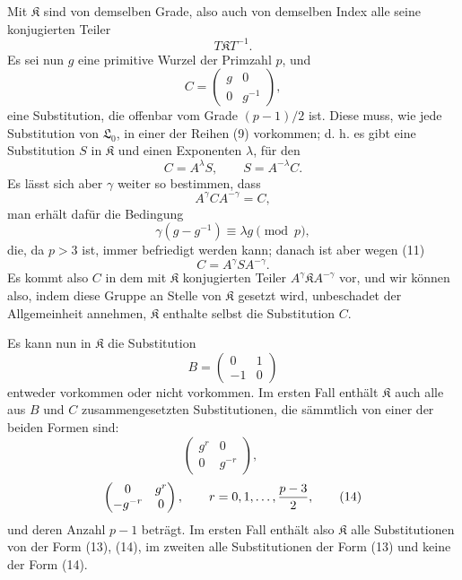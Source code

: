 \documentclass[11pt]{article}
\providecommand{\Lzero}{\mathfrak L_0}
\providecommand{\Kgrp}{\mathfrak K}
\begin{document}
Mit $\Kgrp$ sind von demselben Grade, also auch von demselben Index alle seine konjugierten Teiler
\[
 T\Kgrp T^{-1}.
\]
Es sei nun $g$ eine primitive Wurzel der Primzahl $p$, und
\begin{equation}
 C=\begin{pmatrix}g&0\\0&g^{-1}\end{pmatrix},
\tag{10}
\end{equation}
eine Substitution, die offenbar vom Grade $(p-1)/2$ ist. Diese muss, wie jede Substitution von $\Lzero$, in einer der Reihen (9) vorkommen; d. h. es gibt eine Substitution $S$ in $\Kgrp$ und einen Exponenten $\lambda$, für den
\begin{equation}
 C=A^\lambda S,\qquad S=A^{-\lambda}C.
\tag{11}
\end{equation}
Es lässt sich aber $\gamma$ weiter so bestimmen, dass
\begin{equation}
 A^\gamma C A^{-\gamma}=C,
\tag{12}
\end{equation}
man erhält dafür die Bedingung
\[
 \gamma(g-g^{-1})\equiv\lambda g\pmod p,
\]
die, da $p>3$ ist, immer befriedigt werden kann; danach ist aber wegen (11)
\[
 C=A^\gamma S A^{-\gamma}.
\]
Es kommt also $C$ in dem mit $\Kgrp$ konjugierten Teiler $A^\gamma\Kgrp A^{-\gamma}$ vor, und wir können also, indem diese Gruppe an Stelle von $\Kgrp$ gesetzt wird, unbeschadet der Allgemeinheit annehmen, $\Kgrp$ enthalte selbst die Substitution $C$.

Es kann nun in $\Kgrp$ die Substitution
\[
 B=\begin{pmatrix}0&1\\-1&0\end{pmatrix}
\]
entweder vorkommen oder nicht vorkommen. Im ersten Fall enthält $\Kgrp$ auch alle aus $B$ und $C$ zusammengesetzten Substitutionen, die sämmtlich von einer der beiden Formen sind:
\begin{equation}
 \begin{pmatrix}g^r&0\\0&g^{-r}\end{pmatrix},\qquad
\tag{13}
\end{equation}
\begin{equation}
 \begin{pmatrix}0&g^r\\-g^{-r}&0\end{pmatrix},
 \qquad r=0,1,\ldots,{p-3\over2},
\tag{14}
\end{equation}
und deren Anzahl $p-1$ beträgt. Im ersten Fall enthält also $\Kgrp$ alle Substitutionen von der Form (13), (14), im zweiten alle Substitutionen der Form (13) und keine der Form (14).
\end{document}
